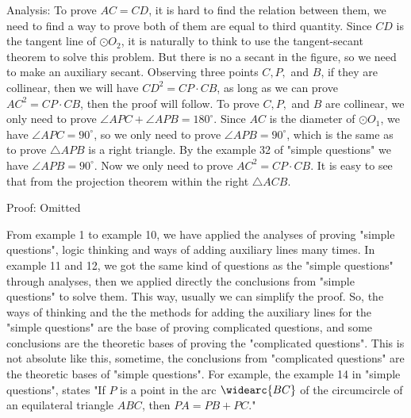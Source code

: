 \documentclass[12pt]{article}
\begin{document}
Analysis: To prove $AC=CD$, it is hard to find the relation between them, we need to find a way to prove both of them are equal to third quantity.
Since $CD$ is the tangent line of $\odot O_2$, it is naturally to think to use the tangent-secant theorem to solve this problem. But there is no a secant in the figure,
so we need to make an auxiliary secant. Observing three points $C, P, $ and $B$, if they are collinear, then we will have $CD^2=CP\cdot CB$, as long as we can prove $AC^2=CP\cdot CB$, then the proof will follow.
To prove $C, P, $ and $B$ are collinear, we only need to prove $\angle APC+\angle APB=180^\circ$. Since $AC$ is the diameter of $\odot O_1$, we have $\angle APC=90^\circ$, so we only need to prove $
\angle APB=90^\circ$, which is  the same as to prove $\triangle APB$ is a right triangle. By the example 32 of "simple questions" we have $\angle APB=90^\circ$. Now we only need to prove
$AC^2=CP\cdot CB$. It is easy to see that from  the projection theorem within the right $\triangle ACB$.

Proof: Omitted


From example 1 to example 10, we have applied the analyses of proving "simple questions", logic thinking and ways of adding auxiliary lines many times.
In example 11 and 12, we got the same kind of questions as the "simple questions" through analyses, then we applied directly the conclusions from "simple questions" to solve them.
This way, usually we can simplify the proof. So, the ways of thinking and  the the methods for adding the auxiliary lines for the "simple questions" are the base of proving complicated questions, and
some conclusions are the theoretic bases of proving the "complicated questions". 
This is not absolute like this, sometime, the conclusions from "complicated questions" are the theoretic bases of "simple questions". For example, the example 14  in "simple questions", states
"If $P$ is a point in the arc $\widearc{BC}$ of the  circumcircle of an equilateral triangle $ABC$, then $PA=PB+PC$."
\end{document}
